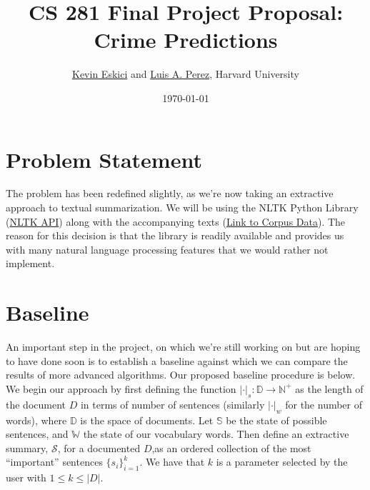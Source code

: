 \documentclass[10pt]{article}
\title{CS 281 Final Project Proposal: Crime Predictions}
\author{\href{mailto:keskici@college.harvard.edu}{Kevin Eskici} and \href{mailto:luisperez@college.harvard.edu}{Luis A. Perez}, Harvard University}
\date{\today}
\begin{document}
 \begin{center}
  \end{center}

\section{Problem Statement}
The problem has been redefined slightly, as we're now taking an extractive approach to textual summarization. We will be using the NLTK Python Library (\href{http://www.nltk.org/api/nltk.html}{NLTK API}) along with the accompanying texts (\href{http://www.nltk.org/nltk_data/}{Link to Corpus Data}). The reason for this decision is that the library is readily available and provides us with many natural language processing features that we would rather not implement. \\

\section{Baseline}
An important step in the project, on which we're still working on but are hoping to have done soon is to establish a baseline against which we can compare the results of more advanced algorithms. Our proposed baseline procedure is below. \\

We begin our approach by first defining the function $|\cdot|_s : \mathbb{D} \to \mathbb{N}^+$ as the length of the document $D$ in terms of number of sentences (similarly $|\cdot|_w$ for the number of words), where $\mathbb{D}$ is the space of documents. Let $\mathbb{S}$ be the state of possible sentences, and $\mathbb{W}$ the state of our vocabulary words. Then define an extractive summary, $\mathcal{S}$, for a documented $D$,as an ordered collection of the most ``important'' sentences $\{s_i\}_{i=1}^k$. We have that $k$ is a parameter selected by the user with $1 \leq k \leq |D|$.\\
\end{document}
